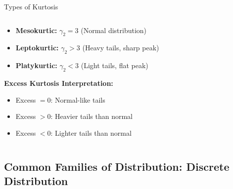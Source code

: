 \documentclass[aspectratio=169,xcolor=dvipsnames,svgnames,x11names,fleqn]{beamer}
\begin{document}
\begin{frame}{Types of Kurtosis}
\begin{columns}
\begin{column}{0.5\textwidth}
\begin{itemize}
    \item \textbf{Mesokurtic:} $\gamma_2 = 3$ (Normal distribution)
    \item \textbf{Leptokurtic:} $\gamma_2 > 3$ (Heavy tails, sharp peak)
    \item \textbf{Platykurtic:} $\gamma_2 < 3$ (Light tails, flat peak)
\end{itemize}

\vspace{0.5cm}
\textbf{Excess Kurtosis Interpretation:}
\begin{itemize}
    \item Excess $= 0$: Normal-like tails
    \item Excess $> 0$: Heavier tails than normal
    \item Excess $< 0$: Lighter tails than normal
\end{itemize}
\end{column}

\begin{column}{0.5\textwidth}
\end{column}
\end{columns}
\end{frame}
    
    \subsection{Common Families of Distribution: Discrete Distribution}
\end{document}
